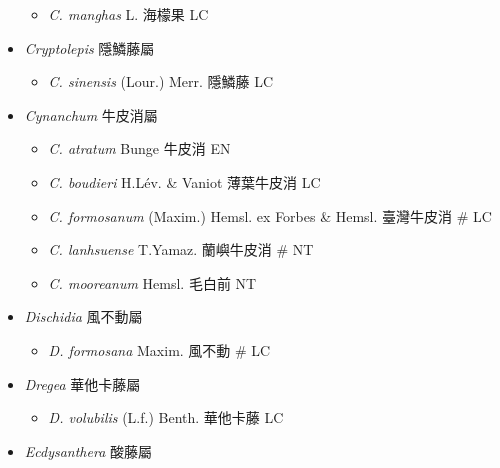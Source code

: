 \begin{itemize}
  \begin{itemize}
        \item[] \textit{C. manghas} L.  海檬果   LC
  \end{itemize}
 \item[] \textit{Cryptolepis} 隱鱗藤屬
                                
  \begin{itemize}
        \item[] \textit{C. sinensis} (Lour.) Merr.  隱鱗藤   LC
  \end{itemize}
 \item[] \textit{Cynanchum} 牛皮消屬
                                
  \begin{itemize}
        \item[] \textit{C. atratum} Bunge  牛皮消   EN
        \item[] \textit{C. boudieri} H.Lév. \& Vaniot  薄葉牛皮消   LC
        \item[] \textit{C. formosanum} (Maxim.) Hemsl. ex Forbes \& Hemsl.  臺灣牛皮消  \# LC
        \item[] \textit{C. lanhsuense} T.Yamaz.  蘭嶼牛皮消  \# NT
        \item[] \textit{C. mooreanum} Hemsl.  毛白前   NT
  \end{itemize}
 \item[] \textit{Dischidia} 風不動屬
                                
  \begin{itemize}
        \item[] \textit{D. formosana} Maxim.  風不動  \# LC
  \end{itemize}
 \item[] \textit{Dregea} 華他卡藤屬
                                
  \begin{itemize}
        \item[] \textit{D. volubilis} (L.f.) Benth.  華他卡藤   LC
  \end{itemize}
 \item[] \textit{Ecdysanthera} 酸藤屬
                                

\end{itemize}
